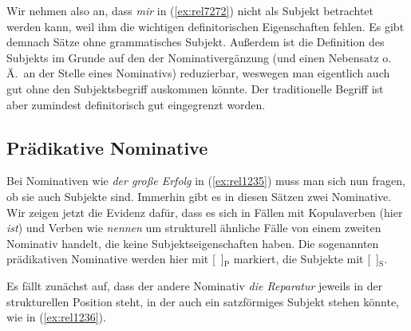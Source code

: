 Wir nehmen also an, dass \textit{mir} in (\ref{ex:rel7272}) nicht als Subjekt betrachtet werden kann, weil ihm die wichtigen definitorischen Eigenschaften fehlen.
Es gibt demnach Sätze ohne grammatisches Subjekt.
Außerdem ist die Definition des Subjekts im Grunde auf den der Nominativergänzung (und einen Nebensatz o.\,Ä.\ an der Stelle eines Nominativs) reduzierbar, weswegen man eigentlich auch gut ohne den Subjektsbegriff auskommen könnte.
Der traditionelle Begriff ist aber zumindest definitorisch gut eingegrenzt worden.

\subsection[Prädikative Nominative]{\Opsional Prädikative Nominative}

\label{sec:praednom}

Bei Nominativen wie \textit{der große Erfolg} in (\ref{ex:rel1235}) muss man sich nun fragen, ob sie auch Subjekte sind.
Immerhin gibt es in diesen Sätzen zwei Nominative.
Wir zeigen jetzt die Evidenz dafür, dass es sich in Fällen mit Kopulaverben (hier \textit{ist}) und Verben wie \textit{nennen} um strukturell ähnliche Fälle von einem zweiten Nominativ handelt, die keine Subjektseigenschaften haben.
Die sogenannten prädikativen Nominative werden hier mit [~]$_\textrm{P}$ markiert, die Subjekte mit [~]$_\textrm{S}$.

\begin{exe}
  \ex\label{ex:rel1235}
  \begin{xlist}
  \end{xlist}
\end{exe}

Es fällt zunächst auf, dass der andere Nominativ \textit{die Reparatur} jeweils in der strukturellen Position steht, in der auch ein satzförmiges Subjekt stehen könnte, wie in (\ref{ex:rel1236}).

\begin{exe}
  \ex\label{ex:rel1236}
  \begin{xlist}
  \end{xlist}
\end{exe}

